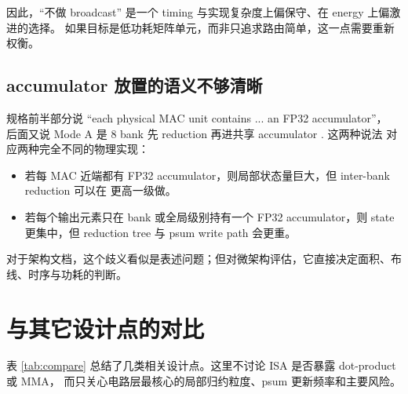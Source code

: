 \documentclass[UTF8,11pt,a4paper]{ctexart}
\newcommand{\modea}{Mode A}
\begin{document}
因此，``不做 broadcast'' 是一个 timing 与实现复杂度上偏保守、在 energy 上偏激进的选择。
如果目标是低功耗矩阵单元，而非只追求路由简单，这一点需要重新权衡。

\subsection{accumulator 放置的语义不够清晰}

规格前半部分说 ``each physical MAC unit contains ... an FP32 accumulator''，
后面又说 \modea{} 是 8 bank 先 reduction 再进共享 accumulator \cite{outercube}. 这两种说法
对应两种完全不同的物理实现：

\begin{itemize}
  \item 若每 MAC 近端都有 FP32 accumulator，则局部状态量巨大，但 inter-bank reduction 可以在
  更高一级做。
  \item 若每个输出元素只在 bank 或全局级别持有一个 FP32 accumulator，则 state 更集中，但
  reduction tree 与 psum write path 会更重。
\end{itemize}

对于架构文档，这个歧义看似是表述问题；但对微架构评估，它直接决定面积、布线、时序与功耗的判断。

\section{与其它设计点的对比}

表 \ref{tab:compare} 总结了几类相关设计点。这里不讨论 ISA 是否暴露 dot-product 或 MMA，
而只关心电路层最核心的局部归约粒度、psum 更新频率和主要风险。
\end{document}

